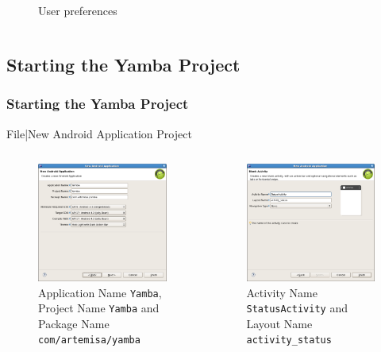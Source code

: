 \begin{frame}
\begin{columns}
\begin{figure}
	\caption{User preferences}
	\end{figure}
\end{columns}

\end{frame}

\subsection{Starting the Yamba Project}
\begin{frame}
\frametitle{Starting the Yamba Project}
File|New Android Application Project\\
\begin{columns}
	\begin{figure}
	\includegraphics[width= 0.8 \textwidth]{yambaNewAndroidApplication1.eps}
	\caption{Application Name \texttt{Yamba}, Project Name \texttt{Yamba} and Package Name \texttt{com/artemisa/yamba}}
	\end{figure}
	\begin{figure}
	\includegraphics[width= 0.8 \textwidth]{yambaNewAndroidApplication2.eps}
	\caption{Activity Name \texttt{StatusActivity} and Layout Name \texttt{activity\_status}}
	\end{figure}
\end{columns}
\end{frame}
